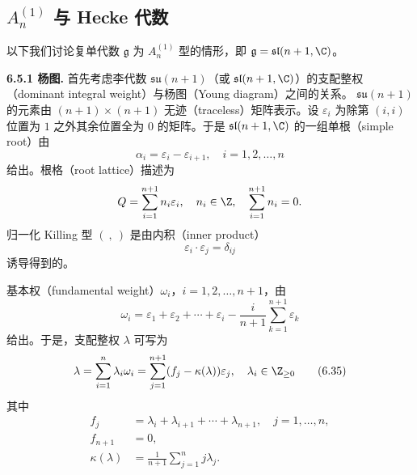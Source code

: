 \subsection{$A_n^{(1)}$ 与 Hecke 代数}

以下我们讨论复单代数 $\mathfrak g$ 为 $A_n^{(1)}$ 型的情形，即
$\mathfrak g=\mathfrak{sl}(n+1,\C)$。

\noindent\textbf{6.5.1 杨图.}\quad
首先考虑李代数 $\mathfrak{su}(n+1)$（或 $\mathfrak{sl}(n+1,\C)$）的支配整权
（dominant integral weight）与杨图（Young diagram）之间的关系。
$\mathfrak{su}(n+1)$ 的元素由 $(n+1)\times(n+1)$ 无迹（traceless）矩阵表示。设
$\varepsilon_i$ 为除第 $(i,i)$ 位置为 $1$ 之外其余位置全为 $0$ 的矩阵。于是
$\mathfrak{sl}(n+1,\C)$ 的一组单根（simple root）由
\[
\alpha_i=\varepsilon_i-\varepsilon_{i+1},\quad i=1,2,\dots,n
\]
给出。根格（root lattice）描述为
\[
Q=\sum_{i=1}^{n+1} n_i\varepsilon_i,\quad n_i\in\Z,\quad
\sum_{i=1}^{n+1}n_i=0.
\]
归一化 Killing 型 $(\ ,\ )$ 是由内积（inner product）
\begin{equation}
\varepsilon_i\cdot\varepsilon_j=\delta_{ij}
\tag{6.34}
\end{equation}
诱导得到的。



基本权（fundamental weight）$\omega_i$，$i=1,2,\dots,n+1$，由
\[
\omega_i=\varepsilon_1+\varepsilon_2+\cdots+\varepsilon_i
-\frac{i}{n+1}\sum_{k=1}^{n+1}\varepsilon_k
\]
给出。于是，支配整权 $\lambda$ 可写为
\begin{equation}
\lambda=\sum_{i=1}^n\lambda_i\omega_i
=\sum_{j=1}^{n+1}(f_j-\kappa(\lambda))\varepsilon_j,
\quad \lambda_i\in\Z_{\ge0}
\tag{6.35}
\end{equation}
其中
\begin{align}
f_j &= \lambda_i+\lambda_{i+1}+\cdots+\lambda_{n+1},
\quad j=1,\dots,n, \tag{6.36}\\
f_{n+1} &= 0, \nonumber\\
\kappa(\lambda) &= \frac{1}{n+1}\sum_{j=1}^n j\lambda_j. \nonumber
\end{align}

